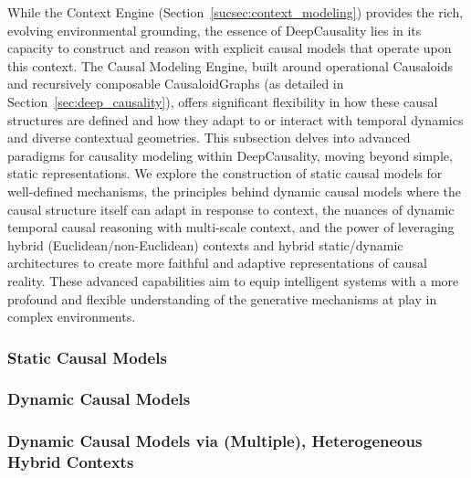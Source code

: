 While the Context Engine (Section~\ref{sucsec:context_modeling}) provides the rich, evolving environmental grounding, the essence of DeepCausality lies in its capacity to construct and reason with explicit causal models that operate upon this context. The Causal Modeling Engine, built around operational Causaloids and recursively composable CausaloidGraphs (as detailed in Section~\ref{sec:deep_causality}), offers significant flexibility in how these causal structures are defined and how they adapt to or interact with temporal dynamics and diverse contextual geometries. This subsection delves into advanced paradigms for causality modeling within DeepCausality, moving beyond simple, static representations. We explore the construction of static causal models for well-defined mechanisms, the principles behind dynamic causal models where the causal structure itself can adapt in response to context, the nuances of dynamic temporal causal reasoning with multi-scale context, and the power of leveraging hybrid (Euclidean/non-Euclidean) contexts and hybrid static/dynamic architectures to create more faithful and adaptive representations of causal reality. These advanced capabilities aim to equip intelligent systems with a more profound and flexible understanding of the generative mechanisms at play in complex environments.

\subsubsection{Static Causal Models}
\label{subsubsec:adv_static_causal_model}

\subsubsection{Dynamic Causal Models}
\label{subsubsec:adv_dynamic_causal_model}

\subsubsection{Dynamic Causal Models via (Multiple), Heterogeneous Hybrid Contexts}
\label{subsubsec:adv_dynamic_causal_model_multiple_contexts}
\newpage

